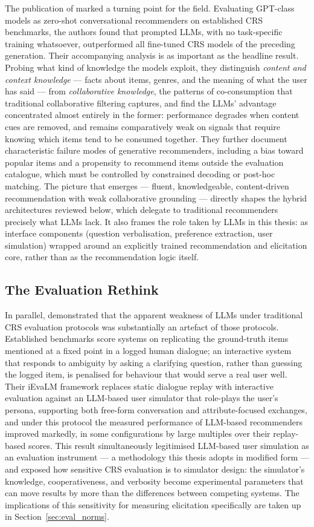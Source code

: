 The publication of \citet{he2023large} marked a turning point for the field. Evaluating GPT-class models as zero-shot conversational recommenders on established CRS benchmarks, the authors found that prompted LLMs, with no task-specific training whatsoever, outperformed all fine-tuned CRS models of the preceding generation. Their accompanying analysis is as important as the headline result. Probing what kind of knowledge the models exploit, they distinguish \textit{content and context knowledge} — facts about items, genres, and the meaning of what the user has said — from \textit{collaborative knowledge}, the patterns of co-consumption that traditional collaborative filtering captures, and find the LLMs' advantage concentrated almost entirely in the former: performance degrades when content cues are removed, and remains comparatively weak on signals that require knowing which items tend to be consumed together. They further document characteristic failure modes of generative recommenders, including a bias toward popular items and a propensity to recommend items outside the evaluation catalogue, which must be controlled by constrained decoding or post-hoc matching. The picture that emerges — fluent, knowledgeable, content-driven recommendation with weak collaborative grounding — directly shapes the hybrid architectures reviewed below, which delegate to traditional recommenders precisely what LLMs lack. It also frames the role taken by LLMs in this thesis: as interface components (question verbalisation, preference extraction, user simulation) wrapped around an explicitly trained recommendation and elicitation core, rather than as the recommendation logic itself.

\subsection{The Evaluation Rethink}

In parallel, \citet{wang2023rethinking} demonstrated that the apparent weakness of LLMs under traditional CRS evaluation protocols was substantially an artefact of those protocols. Established benchmarks score systems on replicating the ground-truth items mentioned at a fixed point in a logged human dialogue; an interactive system that responds to ambiguity by asking a clarifying question, rather than guessing the logged item, is penalised for behaviour that would serve a real user well. Their iEvaLM framework replaces static dialogue replay with interactive evaluation against an LLM-based user simulator that role-plays the user's persona, supporting both free-form conversation and attribute-focused exchanges, and under this protocol the measured performance of LLM-based recommenders improved markedly, in some configurations by large multiples over their replay-based scores. This result simultaneously legitimised LLM-based user simulation as an evaluation instrument — a methodology this thesis adopts in modified form — and exposed how sensitive CRS evaluation is to simulator design: the simulator's knowledge, cooperativeness, and verbosity become experimental parameters that can move results by more than the differences between competing systems. The implications of this sensitivity for measuring elicitation specifically are taken up in Section~\ref{sec:eval_norms}.

